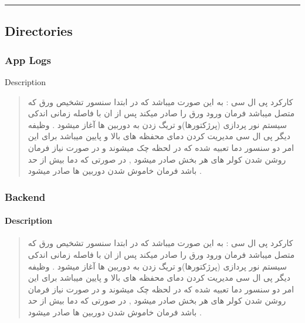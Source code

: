 \documentclass[letterpaper,10pt,english]{sphinxmanual}
\begin{document}
\bigskip\hrule\bigskip



\subsection{Directories}
\label{\detokenize{Setting Software:directories}}
\sphinxstepscope


\subsubsection{App Logs}
\label{\detokenize{setting/app_logs Dir:app-logs}}\label{\detokenize{setting/app_logs Dir::doc}}
\sphinxAtStartPar
Description
\begin{quote}\begin{farsi}

\sphinxAtStartPar
کارکرد پی ال سی : به این صورت میباشد که در ابتدا سنسور تشخیص ورق که متصل میباشد فرمان ورود ورق را صادر میکند پس از ان با فاصله زمانی اندکی سیستم نور پردازی (پرژکتورها)و تریگ زدن به دوربین ها آغاز میشود . وظیفه دیگر پی ال سی مدیریت کردن دمای محفظه های بالا و پایین میباشد برای این امر دو سنسور دما تعبیه شده که در لحظه چک میشوند و در صورت نیاز فرمان روشن شدن کولر های هر بخش صادر میشود , در صورتی که دما بیش از حد باشد فرمان خاموش شدن دوربین ها صادر میشود .
\end{farsi}\end{quote}

\sphinxstepscope


\subsubsection{Backend}
\label{\detokenize{setting/backend Dir:backend}}\label{\detokenize{setting/backend Dir::doc}}

\paragraph{Description}
\label{\detokenize{setting/backend Dir:description}}\begin{quote}\begin{farsi}

\sphinxAtStartPar
کارکرد پی ال سی : به این صورت میباشد که در ابتدا سنسور تشخیص ورق که متصل میباشد فرمان ورود ورق را صادر میکند پس از ان با فاصله زمانی اندکی سیستم نور پردازی (پرژکتورها)و تریگ زدن به دوربین ها آغاز میشود . وظیفه دیگر پی ال سی مدیریت کردن دمای محفظه های بالا و پایین میباشد برای این امر دو سنسور دما تعبیه شده که در لحظه چک میشوند و در صورت نیاز فرمان روشن شدن کولر های هر بخش صادر میشود , در صورتی که دما بیش از حد باشد فرمان خاموش شدن دوربین ها صادر میشود .
\end{farsi}\end{quote}
\end{document}
